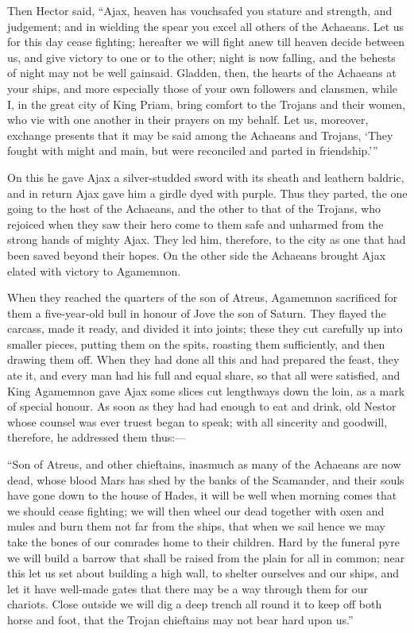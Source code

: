 Then Hector said, “Ajax, heaven has vouchsafed you stature and strength,
and judgement; and in wielding the spear you excel all others of the
Achaeans. Let us for this day cease fighting; hereafter we will fight anew
till heaven decide between us, and give victory to one or to the other;
night is now falling, and the behests of night may not be well gainsaid.
Gladden, then, the hearts of the Achaeans at your ships, and more
especially those of your own followers and clansmen, while I, in the great
city of King Priam, bring comfort to the Trojans and their women, who vie
with one another in their prayers on my behalf. Let us, moreover, exchange
presents that it may be said among the Achaeans and Trojans, ‘They fought
with might and main, but were reconciled and parted in friendship.’”

On this he gave Ajax a silver-studded sword with its sheath and leathern
baldric, and in return Ajax gave him a girdle dyed with purple. Thus they
parted, the one going to the host of the Achaeans, and the other to that
of the Trojans, who rejoiced when they saw their hero come to them safe
and unharmed from the strong hands of mighty Ajax. They led him,
therefore, to the city as one that had been saved beyond their hopes. On
the other side the Achaeans brought Ajax elated with victory to Agamemnon.

When they reached the quarters of the son of Atreus, Agamemnon sacrificed
for them a five-year-old bull in honour of Jove the son of Saturn. They
flayed the carcass, made it ready, and divided it into joints; these they
cut carefully up into smaller pieces, putting them on the spits, roasting
them sufficiently, and then drawing them off. When they had done all this
and had prepared the feast, they ate it, and every man had his full and
equal share, so that all were satisfied, and King Agamemnon gave Ajax some
slices cut lengthways down the loin, as a mark of special honour. As soon
as they had had enough to eat and drink, old Nestor whose counsel was ever
truest began to speak; with all sincerity and goodwill, therefore, he
addressed them thus:—

“Son of Atreus, and other chieftains, inasmuch as many of the Achaeans are
now dead, whose blood Mars has shed by the banks of the Scamander, and
their souls have gone down to the house of Hades, it will be well when
morning comes that we should cease fighting; we will then wheel our dead
together with oxen and mules and burn them not far from the ships, that
when we sail hence we may take the bones of our comrades home to their
children. Hard by the funeral pyre we will build a barrow that shall be
raised from the plain for all in common; near this let us set about
building a high wall, to shelter ourselves and our ships, and let it have
well-made gates that there may be a way through them for our chariots.
Close outside we will dig a deep trench all round it to keep off both
horse and foot, that the Trojan chieftains may not bear hard upon us.”

